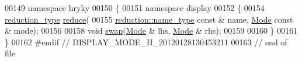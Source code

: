 \begin{DoxyCode}
00149 \textcolor{keyword}{namespace }hryky
00150 \{
00151 \textcolor{keyword}{namespace }display
00152 \{
00154     \hyperlink{classhryky_1_1_intrusive_ptr}{reduction_type} \hyperlink{namespacehryky_1_1display_a705ac3a5de0998e1e0d3fa595044ec55}{reduce}(
00155         \hyperlink{classhryky_1_1reduction_1_1_string}{reduction::name_type} \textcolor{keyword}{const} & name, \hyperlink{classhryky_1_1display_1_1_mode}{Mode} \textcolor{keyword}{const} & mode);
00156 
00158     \textcolor{keywordtype}{void} \hyperlink{namespacehryky_1_1display_ad28f0d5e406742090973e6c81321a00f}{swap}(\hyperlink{classhryky_1_1display_1_1_mode}{Mode} & lhs, \hyperlink{classhryky_1_1display_1_1_mode}{Mode} & rhs);
00159 
00160 \}
00161 \}
00162 \textcolor{preprocessor}{#endif // DISPLAY\_MODE\_H\_20120128130453211}
00163 \textcolor{preprocessor}{}\textcolor{comment}{// end of file}
\end{DoxyCode}
